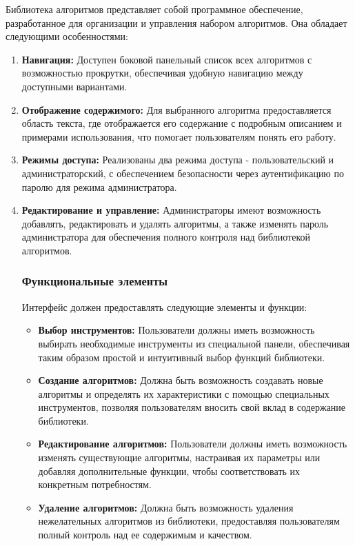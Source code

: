 Библиотека алгоритмов представляет собой программное обеспечение, разработанное для организации и управления набором алгоритмов. Она обладает следующими особенностями:
\begin{enumerate}
	\item \textbf{Навигация:} Доступен боковой панельный список всех алгоритмов с возможностью прокрутки, обеспечивая удобную навигацию между доступными вариантами.
	
	\item \textbf{Отображение содержимого:} Для выбранного алгоритма предоставляется область текста, где отображается его содержание с подробным описанием и примерами использования, что помогает пользователям понять его работу.
	
	\item \textbf{Режимы доступа:} Реализованы два режима доступа - пользовательский и администраторский, с обеспечением безопасности через аутентификацию по паролю для режима администратора.
	
	\item \textbf{Редактирование и управление:} Администраторы имеют возможность добавлять, редактировать и удалять алгоритмы, а также изменять пароль администратора для обеспечения полного контроля над библиотекой алгоритмов.

	
	\subsubsection{Функциональные элементы}
	Интерфейс должен предоставлять следующие элементы и функции:
	\begin{itemize}
	\item \textbf{Выбор инструментов:} Пользователи должны иметь возможность выбирать необходимые инструменты из специальной панели, обеспечивая таким образом простой и интуитивный выбор функций библиотеки.
	
	\item \textbf{Создание алгоритмов:} Должна быть возможность создавать новые алгоритмы и определять их характеристики с помощью специальных инструментов, позволяя пользователям вносить свой вклад в содержание библиотеки.
	
	\item \textbf{Редактирование алгоритмов:} Пользователи должны иметь возможность изменять существующие алгоритмы, настраивая их параметры или добавляя дополнительные функции, чтобы соответствовать их конкретным потребностям.
	
	\item \textbf{Удаление алгоритмов:} Должна быть возможность удаления нежелательных алгоритмов из библиотеки, предоставляя пользователям полный контроль над ее содержимым и качеством.
	

\end{itemize}
\end{enumerate}
